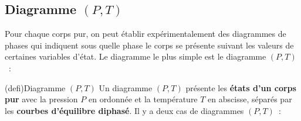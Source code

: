 \documentclass[../../main/main.tex]{subfiles}
\begin{document}
\subsection{Diagramme $(P,T)$}
Pour chaque corps pur, on peut établir expérimentalement des diagrammes de
phases qui indiquent sous quelle phase le corps se présente suivant les valeurs
de certaines variables d’état. Le diagramme le plus simple est le diagramme
$(P,T)$~:
\begin{tcb*}(defi){Diagramme $(P,T)$}
	Un diagramme $(P,T)$ présente les \textbf{états d'un corps pur} avec la pression $P$
	en ordonnée et la température $T$ en abscisse, séparés par les \textbf{courbes
		d'équilibre diphasé}. Il y a deux cas de diagrammes $(P,T)$~:
	\smallbreak
	\begin{isd}
		\begin{center}
\end{center}
\end{isd}
\end{tcb*}
\end{document}
